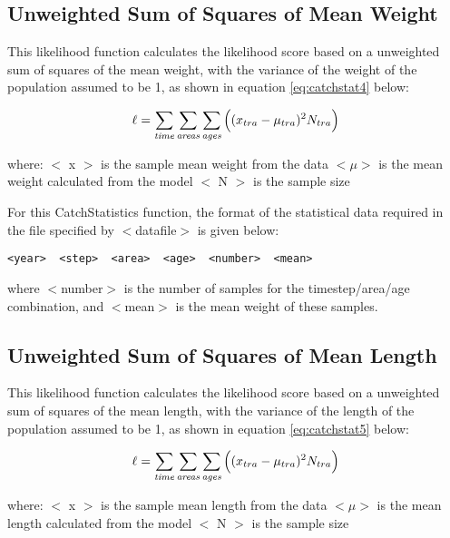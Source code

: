 \documentclass[]{book}
\begin{document}
\hypertarget{unweighted-sum-of-squares-of-mean-weight}{%
\subsection{Unweighted Sum of Squares of Mean Weight}\label{unweighted-sum-of-squares-of-mean-weight}}

This likelihood function calculates the likelihood score based on a
unweighted sum of squares of the mean weight, with the variance of the
weight of the population assumed to be 1, as shown in
equation \eqref{eq:catchstat4} below:

\begin{equation}
\label{eq:catchstat4}
\ell = \sum_{\it time}\sum_{\it areas}\sum_{\it ages} \Big((x_{tra}-\mu_{tra})^2 N_{tra}\Big)\end{equation}

where: \(<\) x \(>\) is the sample mean weight from the data \(<\mu>\) is the
mean weight calculated from the model \(<\) N \(>\) is the sample size

For this CatchStatistics function, the format of the statistical data
required in the file specified by \(<\)datafile\(>\) is given below:

\begin{verbatim}
<year>  <step>  <area>  <age>  <number>  <mean>
\end{verbatim}

where \(<\)number\(>\) is the number of samples for the timestep/area/age
combination, and \(<\)mean\(>\) is the mean weight of these samples.

\hypertarget{unweighted-sum-of-squares-of-mean-length}{%
\subsection{Unweighted Sum of Squares of Mean Length}\label{unweighted-sum-of-squares-of-mean-length}}

This likelihood function calculates the likelihood score based on a
unweighted sum of squares of the mean length, with the variance of the
length of the population assumed to be 1, as shown in
equation \eqref{eq:catchstat5} below:

\begin{equation}
\label{eq:catchstat5}
\ell = \sum_{\it time}\sum_{\it areas}\sum_{\it ages} \Big((x_{tra}-\mu_{tra})^2 N_{tra}\Big)\end{equation}

where: \(<\) x \(>\) is the sample mean length from the data \(<\mu>\) is the
mean length calculated from the model \(<\) N \(>\) is the sample size
\end{document}
